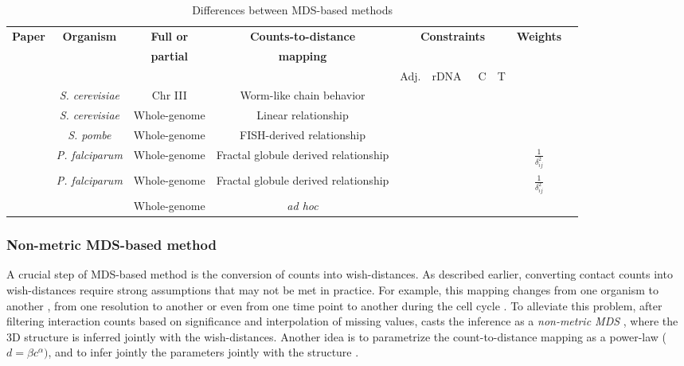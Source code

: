 \documentclass[2columns]{article}
\newcommand*\CHECK{\ding{51}}
\begin{document}
\begin{table*}
\scriptsize
\centering
\begin{tabular}{rccccccccc}
\hline
\multirow{2}{*}{\textbf{Paper}} & \multirow{2}{*}{\textbf{Organism}} &
\textbf{Full or}
& \textbf{Counts-to-distance} &
\multicolumn{4}{c}{\multirow{2}{*}{\textbf{Constraints}}}
& \multirow{2}{*}{\textbf{Weights}}\\
 & & \textbf{partial} & \textbf{mapping} &  \\
 \cmidrule(lr){5-8} 
 & & & & Adj. & rDNA & C & T & \\
\hline
\cite{dekker:capturing} & {\em S. cerevisiae} & Chr III & Worm-like chain
behavior & & & & \\
\cite{duan:three-dimensional} & {\em S. cerevisiae} & Whole-genome & Linear
relationship & \CHECK &  \CHECK & \CHECK &  & \\
\cite{tanizawa:mapping} & {\em S. pombe} & Whole-genome &
FISH-derived relationship & \CHECK & \CHECK & \CHECK & \CHECK &  \\
\cite{ay:three-dimensional} & {\em P. falciparum} & Whole-genome & Fractal
globule derived relationship & \CHECK  & & &
& $\frac{1}{\delta_{ij}^2}$ \\
\cite{peng:sequencing} & {\em P. falciparum} & Whole-genome & Fractal
globule derived relationship & \CHECK  & & &
 & $\frac{1}{\delta_{ij}^2}$ \\
\cite{lesne:3d} & & Whole-genome & \textit{ad hoc} & & & & & \
\end{tabular}
\caption{Differences between MDS-based methods}{}
\label{table:mds_detail}
\end{table*}


\subsubsection*{Non-metric MDS-based method}

A crucial step of MDS-based method is the conversion of counts into
wish-distances. As described earlier, converting contact counts into
wish-distances require strong assumptions that may not be met in practice. For
example, this mapping changes from one organism to another
\citep{fudenberg:higher-order}, from one resolution to another
\citep{zhang:inference} or even from one time point to another during the cell
cycle \citep{le:high-resolution, ay:three-dimensional}. To alleviate this
problem, after filtering interaction counts based on significance and
interpolation of missing values, \citet{ben-elazar:spatial} casts the
inference as a \emph{non-metric MDS} \citep{kruskal:multidimensional}, where
the 3D structure is inferred jointly with the wish-distances. Another idea is
to parametrize the count-to-distance mapping as a power-law ($d = \beta
c^\alpha)$, and to infer jointly the parameters jointly with the structure
\citep{zhang:inference, varoquaux:statistical}.
\end{document}
